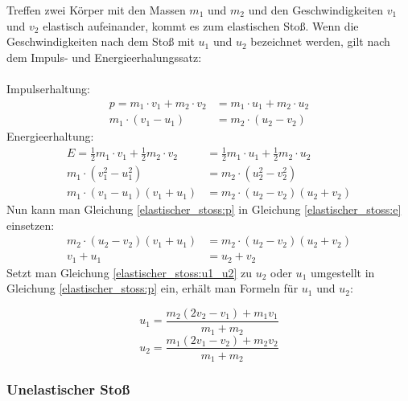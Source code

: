 \documentclass[a4paper]{article}
\begin{document}
				Treffen zwei Körper mit den Massen $m_1$ und $m_2$ und den Geschwindigkeiten $v_1$ und $v_2$ elastisch aufeinander, kommt es zum elastischen Stoß. Wenn die Geschwindigkeiten nach dem Stoß mit $u_1$ und $u_2$ bezeichnet werden, gilt nach dem Impuls- und Energieerhalungssatz:\\\\
				Impulserhaltung:
				\begin{equation}\label{elastischer_stoss:p}
					\begin{aligned}
					p=m_1 \cdot v_1 + m_2 \cdot v_2 &= m_1 \cdot u_1 + m_2 \cdot u_2\\
					m_1 \cdot (v_1 - u_1) &= m_2 \cdot (u_2 - v_2)
					\end{aligned}
				\end{equation}
				Energieerhaltung:
				\begin{equation}\label{elastischer_stoss:e}
					\begin{aligned}
					E=\frac{1}{2}m_1 \cdot v_1 + \frac{1}{2}m_2 \cdot v_2 &= \frac{1}{2}m_1 \cdot u_1 + \frac{1}{2}m_2 \cdot u_2\\
					m_1 \cdot (v_1^2 - u_1^2) &= m_2 \cdot (u_2^2 - v_2^2)\\
						m_1 \cdot (v_1 - u_1)(v_1 + u_1)&= m_2 \cdot (u_2 - v_2)(u_2 + v_2)
					\end{aligned}
				\end{equation}
				Nun kann man Gleichung \ref{elastischer_stoss:p} in Gleichung \ref{elastischer_stoss:e} einsetzen:
				\begin{equation}\label{elastischer_stoss:u1_u2}
					\begin{aligned}
					m_2 \cdot (u_2 - v_2)(v_1 + u_1)&= m_2 \cdot (u_2 - v_2)(u_2 + v_2)\\
					v_1 + u_1&= u_2 + v_2
					\end{aligned}
				\end{equation}
				Setzt man Gleichung \ref{elastischer_stoss:u1_u2} zu $u_2$ oder $u_1$ umgestellt in Gleichung \ref{elastischer_stoss:p} ein, erhält man Formeln für $u_1$ und $u_2$:
				
				\begin{equation}
					u_1=\frac{m_2(2v_2 - v_1) + m_1v_1}{m_1+m_2}
				\end{equation}
				\begin{equation}
					u_2=\frac{m_1(2v_1 - v_2) + m_2v_2}{m_1+m_2}
				\end{equation}
	
			\subsubsection{Unelastischer Stoß}
			
\end{document}
